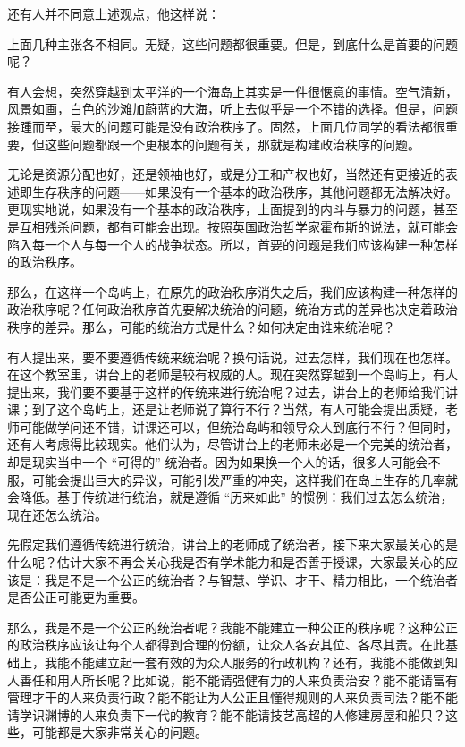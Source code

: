 还有人并不同意上述观点，他这样说：


上面几种主张各不相同。无疑，这些问题都很重要。但是，到底什么是首要的问题呢？

有人会想，突然穿越到太平洋的一个海岛上其实是一件很惬意的事情。空气清新，风景如画，白色的沙滩加蔚蓝的大海，听上去似乎是一个不错的选择。但是，问题接踵而至，最大的问题可能是没有政治秩序了。固然，上面几位同学的看法都很重要，但这些问题都跟一个更根本的问题有关，那就是构建政治秩序的问题。

无论是资源分配也好，还是领袖也好，或是分工和产权也好，当然还有更接近的表述即生存秩序的问题——如果没有一个基本的政治秩序，其他问题都无法解决好。更现实地说，如果没有一个基本的政治秩序，上面提到的内斗与暴力的问题，甚至是互相残杀问题，都有可能会出现。按照英国政治哲学家霍布斯的说法，就可能会陷入每一个人与每一个人的战争状态。所以，首要的问题是我们应该构建一种怎样的政治秩序。

那么，在这样一个岛屿上，在原先的政治秩序消失之后，我们应该构建一种怎样的政治秩序呢？任何政治秩序首先要解决统治的问题，统治方式的差异也决定着政治秩序的差异。那么，可能的统治方式是什么？如何决定由谁来统治呢？

有人提出来，要不要遵循传统来统治呢？换句话说，过去怎样，我们现在也怎样。在这个教室里，讲台上的老师是较有权威的人。现在突然穿越到一个岛屿上，有人提出来，我们要不要基于这样的传统来进行统治呢？过去，讲台上的老师给我们讲课；到了这个岛屿上，还是让老师说了算行不行？当然，有人可能会提出质疑，老师可能做学问还不错，讲课还可以，但统治岛屿和领导众人到底行不行？但同时，还有人考虑得比较现实。他们认为，尽管讲台上的老师未必是一个完美的统治者，却是现实当中一个 “可得的” 统治者。因为如果换一个人的话，很多人可能会不服，可能会提出巨大的异议，可能引发严重的冲突，这样我们在岛上生存的几率就会降低。基于传统进行统治，就是遵循 “历来如此” 的惯例：我们过去怎么统治，现在还怎么统治。

先假定我们遵循传统进行统治，讲台上的老师成了统治者，接下来大家最关心的是什么呢？估计大家不再会关心我是否有学术能力和是否善于授课，大家最关心的应该是：我是不是一个公正的统治者？与智慧、学识、才干、精力相比，一个统治者是否公正可能更为重要。

那么，我是不是一个公正的统治者呢？我能不能建立一种公正的秩序呢？这种公正的政治秩序应该让每个人都得到合理的份额，让众人各安其位、各尽其责。在此基础上，我能不能建立起一套有效的为众人服务的行政机构？还有，我能不能做到知人善任和用人所长呢？比如说，能不能请强健有力的人来负责治安？能不能请富有管理才干的人来负责行政？能不能让为人公正且懂得规则的人来负责司法？能不能请学识渊博的人来负责下一代的教育？能不能请技艺高超的人修建房屋和船只？这些，可能都是大家非常关心的问题。

